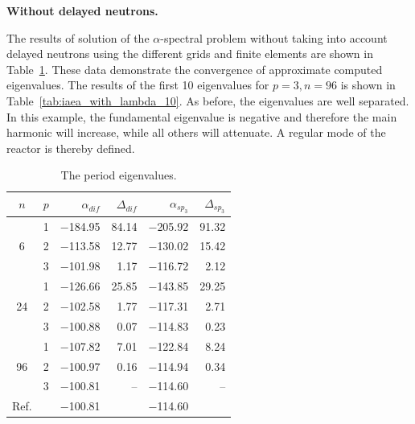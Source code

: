 \documentclass[authoryear]{elsarticle}
\begin{document}
\textbf{Without delayed neutrons.}

The results of solution of the $\alpha$-spectral problem without taking into account delayed neutrons using the different grids and finite elements are shown in Table~\ref{tab:iaea_with_alpha}.
These data demonstrate the convergence of approximate computed eigenvalues.
The results of the first 10 eigenvalues for $ p = 3, n = 96 $ is shown in Table~\ref{tab:iaea_with_lambda_10}.
As before, the eigenvalues are well separated.
In this example, the fundamental eigenvalue is negative and therefore the main harmonic will increase, while all others will attenuate. 
A regular mode of the reactor is thereby defined.

\begin{table}[h]
\caption{The period eigenvalues.}
\label{tab:iaea_with_alpha}
\begin{center}
\begin{tabular}{c c r r r r}
\hline
$n$ & $p$ & $\alpha_{dif}$ & $\Delta_{dif}$ &$\alpha_{sp_3}$& $\Delta_{sp_3}$ \\
\hline
	& 1	& $-$184.95 & 84.14 & $-$205.92 & 91.32\\
6	& 2	& $-$113.58 & 12.77 & $-$130.02 & 15.42\\
	& 3	& $-$101.98 &  1.17 & $-$116.72 &  2.12\\ 
\hline
	& 1	& $-$126.66 & 25.85 & $-$143.85 & 29.25\\
24& 2	& $-$102.58 &  1.77 & $-$117.31 &  2.71\\
	& 3	& $-$100.88 &  0.07 & $-$114.83 &  0.23\\ 
\hline
	& 1	& $-$107.82 &  7.01 & $-$122.84 & 8.24\\
96& 2	& $-$100.97 &  0.16 & $-$114.94 & 0.34\\
	& 3	& $-$100.81 &	 -- & $-$114.60 &  -- \\ 
\hline
Ref.& & $-$100.81 & & $-$114.60 \\ 
\hline
\end{tabular}
\end{center}
\end{table}
\end{document}
